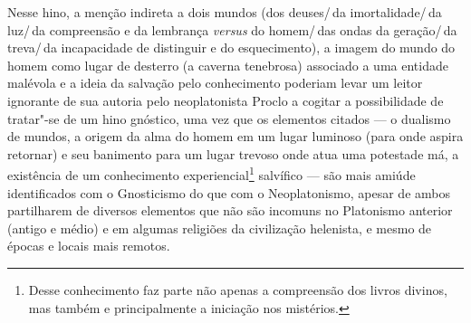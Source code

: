 Nesse hino, a menção indireta a dois mundos (dos deuses/\,da
imortalidade/\,da luz/\,da compreensão e da lembrança
\emph{versus} do homem/\,das ondas da geração/\,da treva/\,da
incapacidade de distinguir e do esquecimento), a imagem do mundo
do homem como lugar de desterro (a caverna tenebrosa) associado
a uma entidade malévola e a ideia da salvação pelo conhecimento
poderiam levar um leitor ignorante de sua autoria pelo
neoplatonista Proclo a cogitar a possibilidade de tratar"-se de
um hino gnóstico, uma vez que os elementos citados --- o dualismo
de mundos, a origem da alma do homem em um lugar luminoso (para
onde aspira retornar) e seu banimento para um lugar trevoso onde
atua uma potestade má, a existência de um conhecimento
experiencial\footnote{ Desse conhecimento faz parte não apenas a
compreensão dos livros divinos, mas também e principalmente a
iniciação nos mistérios.}  salvífico --- são mais amiúde
identificados com o Gnosticismo do que com o Neoplatonismo,
apesar de ambos partilharem de diversos elementos que não são
incomuns no Platonismo anterior (antigo e médio) e em algumas
religiões da civilização helenista, e mesmo de épocas e locais
mais remotos.

